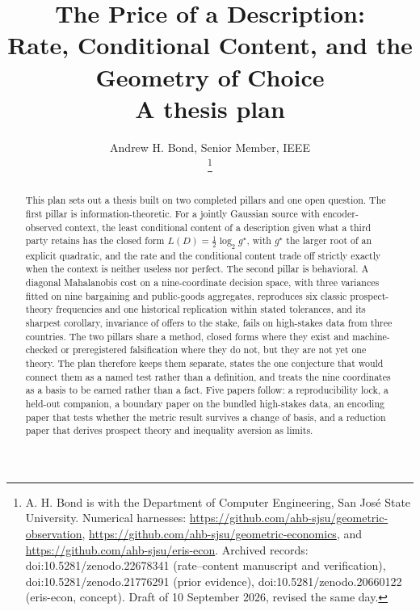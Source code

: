 \documentclass[11pt,onecolumn]{IEEEtran}
\begin{document}
\title{The Price of a Description:\\ Rate, Conditional Content, and the Geometry of Choice\\
\large A thesis plan}

\author{Andrew H. Bond, Senior Member, IEEE\\
\thanks{A. H. Bond is with the Department of Computer Engineering, San Jos\'e State University.
Numerical harnesses: \url{https://github.com/ahb-sjsu/geometric-observation},
\url{https://github.com/ahb-sjsu/geometric-economics}, and \url{https://github.com/ahb-sjsu/eris-econ}.
Archived records: doi:10.5281/zenodo.22678341 (rate--content manuscript and verification),
doi:10.5281/zenodo.21776291 (prior evidence), doi:10.5281/zenodo.20660122 (eris-econ, concept).
Draft of 10 September 2026, revised the same day.}}

\maketitle

\begin{abstract}
This plan sets out a thesis built on two completed pillars and one open question.
The first pillar is information-theoretic.
For a jointly Gaussian source with encoder-observed context, the least conditional content of a description given what a third party retains has the closed form $L(D)=\tfrac12\log_2 g^\star$, with $g^\star$ the larger root of an explicit quadratic, and the rate and the conditional content trade off strictly exactly when the context is neither useless nor perfect.
The second pillar is behavioral.
A diagonal Mahalanobis cost on a nine-coordinate decision space, with three variances fitted on nine bargaining and public-goods aggregates, reproduces six classic prospect-theory frequencies and one historical replication within stated tolerances, and its sharpest corollary, invariance of offers to the stake, fails on high-stakes data from three countries.
The two pillars share a method, closed forms where they exist and machine-checked or preregistered falsification where they do not, but they are not yet one theory.
The plan therefore keeps them separate, states the one conjecture that would connect them as a named test rather than a definition, and treats the nine coordinates as a basis to be earned rather than a fact.
Five papers follow: a reproducibility lock, a held-out companion, a boundary paper on the bundled high-stakes data, an encoding paper that tests whether the metric result survives a change of basis, and a reduction paper that derives prospect theory and inequality aversion as limits.
\end{abstract}
\end{document}
